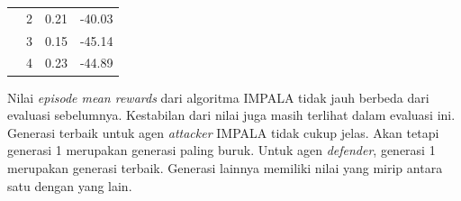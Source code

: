 \begin{table}[H]
\begin{tabular}{|c|c|l|l|}
    & 2                                                                            & 0.21                                                                                                  & -40.03                                                                                                \\ \cline{2-4} 
    & 3                                                                            & 0.15                                                                                                  & -45.14                                                                                                \\ \cline{2-4} 
    & 4                                                                            & 0.23                                                                                                  & -44.89                                                                                                \\ \hline
  \end{tabular}
\end{table}

Nilai \emph{episode mean rewards} dari algoritma IMPALA tidak jauh berbeda dari evaluasi sebelumnya.
Kestabilan dari nilai juga masih terlihat dalam evaluasi ini.
Generasi terbaik untuk agen \emph{attacker} IMPALA tidak cukup jelas.
Akan tetapi generasi 1 merupakan generasi paling buruk.
Untuk agen \emph{defender}, generasi 1 merupakan generasi terbaik.
Generasi lainnya memiliki nilai yang mirip antara satu dengan yang lain.